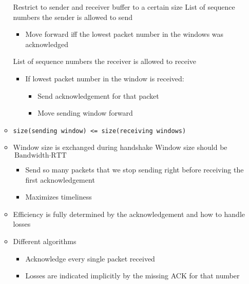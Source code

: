 \begin{itemize}
\begin{itemize}
             Restrict to sender and receiver buffer to a certain size
             List of sequence numbers the sender is allowed to send
                \begin{itemize}
                    \item Move forward iff the lowest packet number in the windows was acknowledged
                \end{itemize}
             List of sequence numbers the receiver is allowed to receive
                \begin{itemize}
                    \item If lowest packet number in the window is received:
                        \begin{itemize}
                            \item Send acknowledgement for that packet
                            \item Move sending window forward
                        \end{itemize}
                \end{itemize}
            \item \verb+size(sending window) <= size(receiving windows)+
            \item Window size is exchanged during handshake
             Window size should be $\text{Bandwidth} \cdot \text{RTT}$
                \begin{itemize}
                    \item Send so many packets that we stop sending right before receiving the first acknowledgement
                    \item Maximizes timeliness
                \end{itemize}
        \end{itemize}
        \begin{itemize}
            \item Efficiency is fully determined by the acknowledgement and how to handle losses
            \item Different algorithms
                \begin{itemize}
                    \item Acknowledge every single packet received
                    \item Losses are indicated implicitly by the missing ACK for that number

\end{itemize}
\end{itemize}
\end{itemize}
